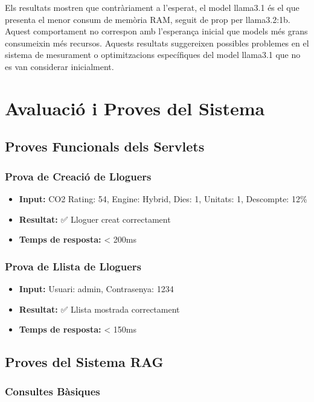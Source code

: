 \documentclass[12pt,a4paper]{article}
\begin{document}
Els resultats mostren que contràriament a l'esperat, el model llama3.1 és el que presenta el menor consum de memòria RAM, seguit de prop per llama3.2:1b. Aquest comportament no correspon amb l'esperança inicial que models més grans consumeixin més recursos. Aquests resultats suggereixen possibles problemes en el sistema de mesurament o optimitzacions específiques del model llama3.1 que no es van considerar inicialment.

\section{Avaluació i Proves del Sistema}

\subsection{Proves Funcionals dels Servlets}

\subsubsection{Prova de Creació de Lloguers}

\begin{itemize}
    \item \textbf{Input:} CO2 Rating: 54, Engine: Hybrid, Dies: 1, Unitats: 1, Descompte: 12\%
    \item \textbf{Resultat:} ✅ Lloguer creat correctament
    \item \textbf{Temps de resposta:} < 200ms
\end{itemize}

\subsubsection{Prova de Llista de Lloguers}

\begin{itemize}
    \item \textbf{Input:} Usuari: admin, Contrasenya: 1234
    \item \textbf{Resultat:} ✅ Llista mostrada correctament
    \item \textbf{Temps de resposta:} < 150ms
\end{itemize}

\subsection{Proves del Sistema RAG}

\subsubsection{Consultes Bàsiques}
\end{document}
